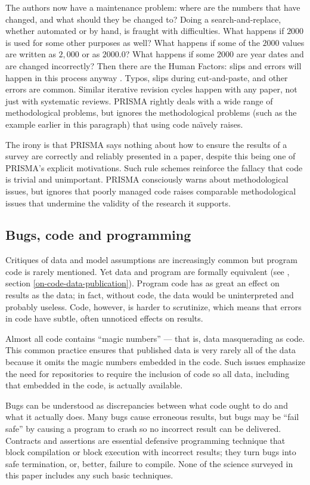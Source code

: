 \documentclass{comjnl}
\begin{document}
The authors now have a maintenance problem: where are the numbers that have changed, and what should they be changed to? Doing a search-and-replace, whether automated or by hand, is fraught with difficulties. What happens if $2000$ is used for some other purposes as well? What happens if some of the $2000$ values are written as $2,000$ or as $2000.0$? What happens if some $2000$ are year dates and are changed incorrectly? Then there are the Human Factors: slips and errors will happen in this process anyway \cite{engima}. Typos, slips during cut-and-paste, and other errors are common. Similar iterative revision cycles happen with any paper, not just with systematic reviews. PRISMA rightly deals with a wide range of methodological problems, but ignores the methodological problems (such as the example earlier in this paragraph) that using code na\"\i vely raises. 

The irony is that PRISMA says nothing about how to ensure the results of a survey are correctly and reliably presented in a paper, despite this being one of PRISMA's explicit motivations. Such rule schemes reinforce the fallacy that code is trivial and unimportant. PRISMA consciously warns about  methodological issues, but ignores that poorly managed code raises comparable methodological issues that undermine the validity of the research it supports.

\subsection{Bugs, code and programming}\label{knowledge}
Critiques of data and model assumptions are increasingly common \cite{critiques,diagnosis-reviews} but program code is rarely mentioned. Yet data and program are formally equivalent (see \supplement, section \ref{on-code-data-publication}). Program code has as great an effect on results as the data; in fact, without code, the data would be uninterpreted and probably useless. Code, however, is harder to scrutinize, which means that errors in code have subtle, often unnoticed effects on results.

Almost all code contains ``magic numbers'' --- that is, data masquerading as code. This common practice ensures that published data is very rarely all of the data because it omits the magic numbers embedded in the code. Such issues emphasize the need for repositories to require the inclusion of code so all data, including that embedded in the code, is actually available. 

Bugs can be understood as discrepancies between what code ought to do and what it actually does. Many bugs cause erroneous results, but bugs may be ``fail safe'' by causing a program to crash so no incorrect result can be delivered. Contracts and assertions are essential defensive programming technique that block compilation or block execution with incorrect results; they turn bugs into safe termination, or, better, failure to compile. None of the science surveyed in this paper includes any such basic techniques. 
\end{document}
